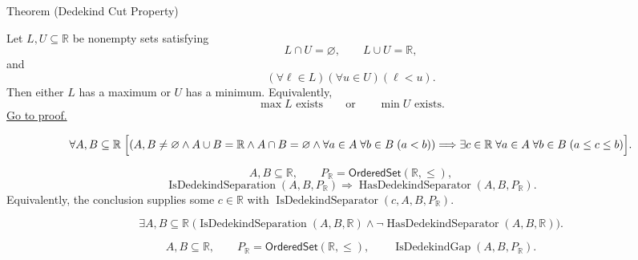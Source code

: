 \begin{theorembox}{Theorem (Dedekind Cut Property)}
\begin{theorem}
\label{thm:dedekind-cut-property}
Let $L,U\subseteq\mathbb{R}$ be nonempty sets satisfying
\[
  L\cap U=\varnothing,
  \qquad
  L\cup U=\mathbb{R},
\]
and
\[
  (\forall \ell\in L)(\forall u\in U)(\ell<u).
\]
Then either $L$ has a maximum or $U$ has a minimum.  Equivalently,
\[
  \max L\text{ exists}
  \qquad\text{or}\qquad
  \min U\text{ exists}.
\]
\hyperref[prf:dedekind-cut-property]{Go to proof.}
\end{theorem}
\end{theorembox}
\begin{remark*}
\[
\forall A,B\subseteq\mathbb{R}\;
\Bigl[
(A,B\ne\varnothing\land A\cup B=\mathbb{R}\land A\cap B=\varnothing
\land \forall a\in A\;\forall b\in B\;(a<b))
\Longrightarrow
\exists c\in\mathbb{R}\;\forall a\in A\;\forall b\in B\;(a\le c\le b)
\Bigr].
\]
\end{remark*}
\begin{remark*}
\[
A,B\subseteq\mathbb{R},\qquad P_{\mathbb{R}}=\mathsf{OrderedSet}(\mathbb{R},\leq),
\]
\[
\operatorname{IsDedekindSeparation}(A,B,P_{\mathbb{R}})\Longrightarrow
\operatorname{HasDedekindSeparator}(A,B,P_{\mathbb{R}}).
\]
Equivalently, the conclusion supplies some $c\in\mathbb{R}$ with
\(\operatorname{IsDedekindSeparator}(c,A,B,P_{\mathbb{R}})\).
\end{remark*}
\begin{remark*}
\[
\exists A,B\subseteq\mathbb{R}\;
\bigl(\operatorname{IsDedekindSeparation}(A,B,\mathbb{R})\land
\neg\operatorname{HasDedekindSeparator}(A,B,\mathbb{R})\bigr).
\]
\end{remark*}
\begin{remark*}
\[
A,B\subseteq\mathbb{R},\qquad P_{\mathbb{R}}=\mathsf{OrderedSet}(\mathbb{R},\leq),\qquad
\operatorname{IsDedekindGap}(A,B,P_{\mathbb{R}}).
\]
\end{remark*}


